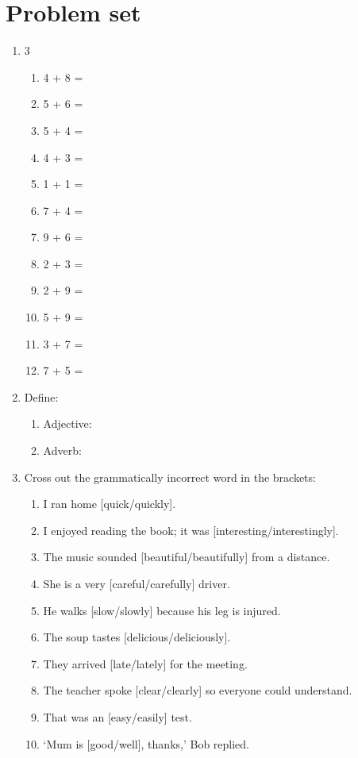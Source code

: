 \documentclass{tufte-book}
\begin{document}
\clearpage\section{Problem set }

\begin{enumerate}
  \item
  \begin{multicols}{3}
    \begin{enumerate}\bigskip
      \item 4 + 8 = \dotfill\bigskip
      \item 5 + 6 = \dotfill\bigskip
      \item 5 + 4 = \dotfill\bigskip
      \item 4 + 3 = \dotfill
      \item 1 + 1 = \dotfill\bigskip
      \item 7 + 4 = \dotfill\bigskip
      \item 9 + 6 = \dotfill\bigskip
      \item 2 + 3 = \dotfill
      \item 2 + 9 = \dotfill\bigskip
      \item 5 + 9 = \dotfill\bigskip
      \item 3 + 7 = \dotfill\bigskip
      \item 7 + 5 = \dotfill
    \end{enumerate}
  \end{multicols}
  
  \item Define:
  \begin{enumerate}\bigskip
    \item Adjective: \dotfill\bigskip
    \item Adverb: \dotfill
  \end{enumerate}

  \item Cross out the grammatically incorrect word in the brackets:
  \begin{enumerate}
    \item I ran home [quick/quickly].
    \item I enjoyed reading the book; it was [interesting/interestingly].
    \item The music sounded [beautiful/beautifully] from a distance.
    \item She is a very [careful/carefully] driver.
    \item He walks [slow/slowly] because his leg is injured.
    \item The soup tastes [delicious/deliciously].
    \item They arrived [late/lately] for the meeting.
    \item The teacher spoke [clear/clearly] so everyone could understand.
    \item That was an [easy/easily] test.
    \item `Mum is [good/well], thanks,' Bob replied.
  \end{enumerate}


\end{enumerate}
\end{document}
